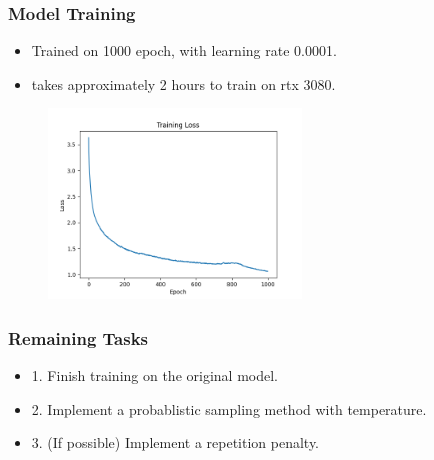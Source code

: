 \documentclass[
    10pt %
    16:9, %
]{beamer}
\begin{document}
\frame 
{
  \frametitle{Model Training}
  \begin{itemize}
    \item Trained on 1000 epoch, with learning rate 0.0001.
    \item takes approximately 2 hours to train on rtx 3080.
  \end{itemize}
  \begin{figure}
    \centering
    \includegraphics[width=0.6\textwidth]{loss.png}
  \end{figure}
}



\frame
{
  \frametitle{Remaining Tasks}
  \begin{itemize}
    \item 1. Finish training on the original model.
    \item 2. Implement a probablistic sampling method with temperature.
    \item 3. (If possible) Implement a repetition penalty.
  \end{itemize}
}
\end{document}
